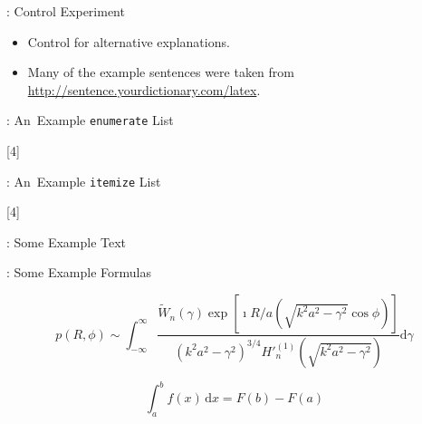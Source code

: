 \begin{frame}{\titleprefix: Control Experiment}

	\begin{itemize}
		\item Control for alternative explanations.
		\item Many of the example sentences were taken from \url{http://sentence.yourdictionary.com/latex}.
	\end{itemize}

\end{frame}


\begin{frame}{\titleprefix: An~Example \texttt{enumerate} List}


\end{frame}


\begin{frame}{\titleprefix: An~Example \texttt{itemize} List}


\end{frame}


\begin{frame}{\titleprefix: Some Example Text}


	\blindtext

\end{frame}


\begin{frame}{\titleprefix: Some Example Formulas}

	\[
		p(R, \phi) \sim
			\int_{-\infty}^\infty
				\frac
					{ \tilde{W}_n(\gamma) \exp \left[ \imath R / a \left( \sqrt{k^2 a^2 - \gamma^2} \cos \phi \right) \right] }
					{ (k^2 a^2 - \gamma^2)^{3/4} {H'}_n^{(1)} \left( \sqrt{k^2 a^2 - \gamma^2} \right) }
			\mathup{d}\gamma
	\]
	
	\[
		\int_{a}^{b} f(x)\,\mathup{d}x = F(b) - F(a)
	\]

\end{frame}


